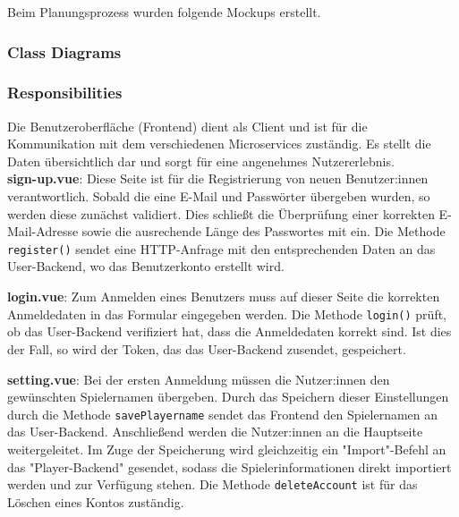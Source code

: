 Beim Planungsprozess wurden folgende Mockups erstellt.


\subsubsection{Class Diagrams}


\subsubsection{Responsibilities}

Die Benutzeroberfläche (Frontend) dient als Client und ist für die Kommunikation mit dem verschiedenen Microservices zuständig. Es stellt die Daten übersichtlich dar und sorgt für eine
angenehmes Nutzererlebnis. \\

\textbf{sign-up.vue}: Diese Seite ist für die Registrierung von neuen Benutzer:innen verantwortlich. Sobald die eine E-Mail und Passwörter übergeben wurden, so werden diese zunächst
validiert. Dies schließt die Überprüfung einer korrekten E-Mail-Adresse sowie die ausrechende Länge des Passwortes mit ein. Die Methode \verb|register()| sendet eine HTTP-Anfrage mit den 
entsprechenden Daten an das User-Backend, wo das Benutzerkonto erstellt wird.
\newline

\textbf{login.vue}: Zum Anmelden eines Benutzers muss auf dieser Seite die korrekten Anmeldedaten in das Formular eingegeben werden. Die Methode \verb|login()| prüft, ob das User-Backend
verifiziert hat, dass die Anmeldedaten korrekt sind. Ist dies der Fall, so wird der Token, das das User-Backend zusendet, gespeichert. 
\newline

\textbf{setting.vue}: Bei der ersten Anmeldung müssen die Nutzer:innen den gewünschten Spielernamen übergeben. Durch das Speichern dieser Einstellungen durch die Methode \verb|savePlayername|
sendet das Frontend den Spielernamen an das User-Backend. Anschließend werden die Nutzer:innen an die Hauptseite weitergeleitet. Im Zuge der Speicherung wird gleichzeitig ein "Import"-Befehl
an das "Player-Backend" gesendet, sodass die Spielerinformationen direkt importiert werden und zur Verfügung stehen. Die Methode \verb|deleteAccount| ist für das Löschen eines Kontos zuständig.
\newline

